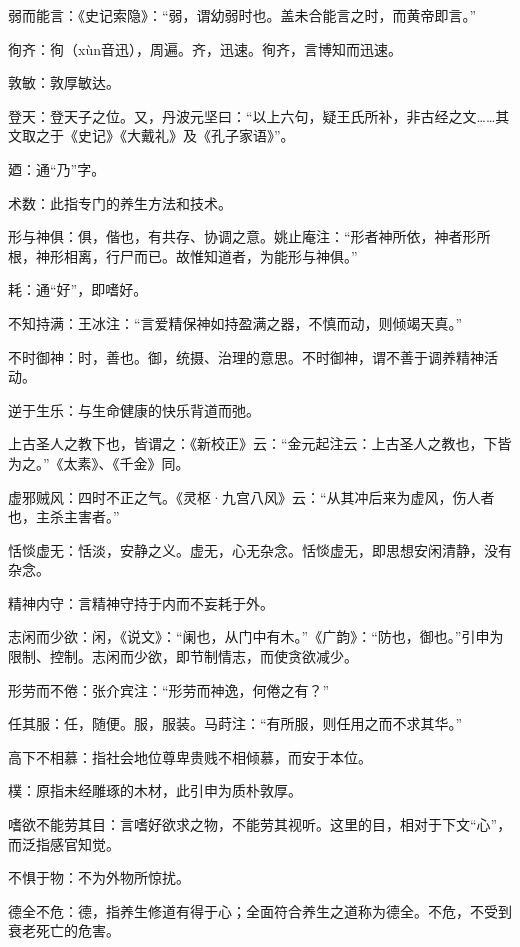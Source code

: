 \documentclass[draft,12pt]{ctexbook}
\begin{document}
\begin{jiaozhu}
  \item 弱而能言：《史记索隐》：“弱，谓幼弱时也。盖未合能言之时，而黄帝即言。”
  \item 徇齐：徇（xùn音迅），周遍。齐，迅速。徇齐，言博知而迅速。
  \item 敦敏：敦厚敏达。
  \item 登天：登天子之位。又，丹波元坚曰：“以上六句，疑王氏所补，非古经之文……其文取之于《史记》《大戴礼》及《孔子家语》”。
  \item 廼：通“乃”字。
  \item 术数：此指专门的养生方法和技术。
  \item 形与神俱：俱，偕也，有共存、协调之意。姚止庵注：“形者神所依，神者形所根，神形相离，行尸而已。故惟知道者，为能形与神俱。”
  \item 耗：通“好”，即嗜好。
  \item 不知持满：王冰注：“言爱精保神如持盈满之器，不慎而动，则倾竭天真。”
  \item 不时御神：时，善也。御，统摄、治理的意思。不时御神，谓不善于调养精神活动。
  \item 逆于生乐：与生命健康的快乐背道而弛。
  \item 上古圣人之教下也，皆谓之：《新校正》云：“金元起注云：上古圣人之教也，下皆为之。”《太素》、《千金》同。
  \item 虚邪贼风：四时不正之气。《灵枢·九宫八风》云：“从其冲后来为虚风，伤人者也，主杀主害者。”
  \item 恬惔虚无：恬淡，安静之义。虚无，心无杂念。恬惔虚无，即思想安闲清静，没有杂念。
  \item 精神内守：言精神守持于内而不妄耗于外。
  \item 志闲而少欲：闲，《说文》：“阑也，从门中有木。”《广韵》：“防也，御也。”引申为限制、控制。志闲而少欲，即节制情志，而使贪欲减少。
  \item 形劳而不倦：张介宾注：“形劳而神逸，何倦之有？”
  \item 任其服：任，随便。服，服装。马莳注：“有所服，则任用之而不求其华。”
  \item 高下不相慕：指社会地位尊卑贵贱不相倾慕，而安于本位。
  \item 樸：原指未经雕琢的木材，此引申为质朴敦厚。
  \item 嗜欲不能劳其目：言嗜好欲求之物，不能劳其视听。这里的目，相对于下文“心”，而泛指感官知觉。
  \item 不惧于物：不为外物所惊扰。
  \item 德全不危：德，指养生修道有得于心；全面符合养生之道称为德全。不危，不受到衰老死亡的危害。
\end{jiaozhu}
\end{document}
